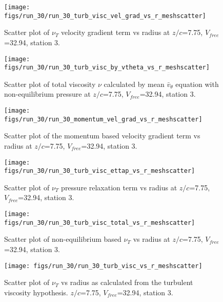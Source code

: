 \begin{figure}[H]
\centering
\texttt{[image: figs/run\_30/run\_30\_turb\_visc\_vel\_grad\_vs\_r\_meshscatter]}
\caption{Scatter plot of $\nu_T$ velocity gradient term vs radius at $z/c$=7.75, $V_{free}$=32.94, station 3.}
\end{figure}


\begin{figure}[H]
\centering
\texttt{[image: figs/run\_30/run\_30\_turb\_visc\_by\_vtheta\_vs\_r\_meshscatter]}
\caption{Scatter plot of total viscosity $\nu$ calculated by mean $\bar{v}_{\theta}$ equation with non-equilibrium pressure at $z/c$=7.75, $V_{free}$=32.94, station 3.}
\end{figure}


\begin{figure}[H]
\centering
\texttt{[image: figs/run\_30/run\_30\_momentum\_vel\_grad\_vs\_r\_meshscatter]}
\caption{Scatter plot of the momentum based velocity gradient term vs radius at $z/c$=7.75, $V_{free}$=32.94, station 3.}
\end{figure}


\begin{figure}[H]
\centering
\texttt{[image: figs/run\_30/run\_30\_turb\_visc\_ettap\_vs\_r\_meshscatter]}
\caption{Scatter plot of $\nu_T$ pressure relaxation term vs radius at $z/c$=7.75, $V_{free}$=32.94, station 3.}
\end{figure}


\begin{figure}[H]
\centering
\texttt{[image: figs/run\_30/run\_30\_turb\_visc\_total\_vs\_r\_meshscatter]}
\caption{Scatter plot of non-equilibrium based $\nu_T$ vs radius at $z/c$=7.75, $V_{free}$=32.94, station 3.}
\end{figure}


\begin{figure}[H]
\centering
\texttt{[image: figs/run\_30/run\_30\_turb\_visc\_vs\_r\_meshscatter]}
\caption{Scatter plot of $\nu_T$ vs radius as calculated from the turbulent viscosity hypothesis. $z/c$=7.75, $V_{free}$=32.94, station 3.}
\end{figure}


